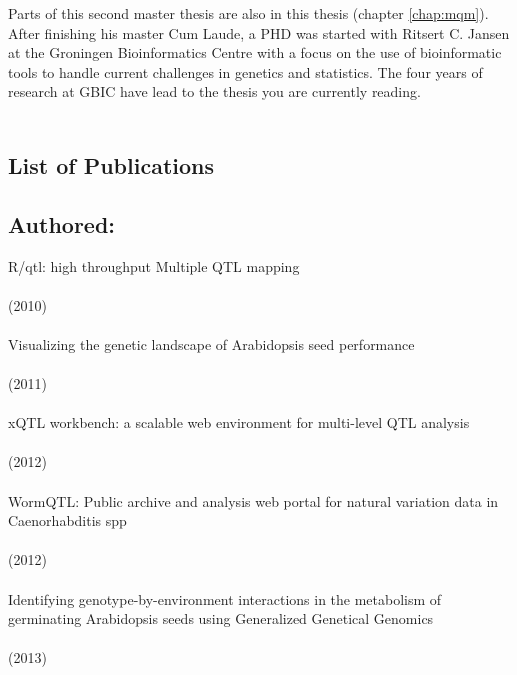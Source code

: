 Parts of this second master thesis are also in this thesis (chapter \ref{chap:mqm}).
After finishing his master Cum Laude, a PHD was started with Ritsert C. Jansen at the 
Groningen Bioinformatics Centre with a focus on the use of bioinformatic tools to handle 
current challenges in genetics and statistics. The four years of research at GBIC have 
lead to the thesis you are currently reading.\\\\

\newpage

\subsection*{List of Publications}

\subsection*{Authored:}
   R/qtl: high throughput Multiple QTL mapping\\
  \\
   (2010)\\\\
  Visualizing the genetic landscape of Arabidopsis seed performance\\
  \\
   (2011)\\\\
  xQTL workbench: a scalable web environment for multi-level QTL analysis\\
  \\
   (2012)\\\\
  WormQTL: Public archive and analysis web portal for natural variation data in Caenorhabditis spp\\
  \\
   (2012)\\\\
  Identifying genotype-by-environment interactions in the metabolism of germinating Arabidopsis seeds 
  using Generalized Genetical Genomics\\
  \\
   (2013)

